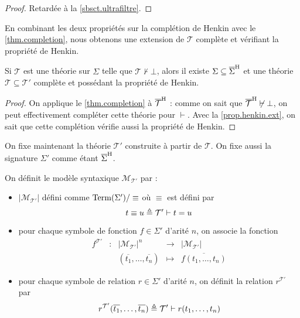 \begin{proof}
  Retardée à la \cref{sbsct.ultrafiltre}.
\end{proof}

En combinant les deux propriétés sur la complétion de Henkin avec le
\cref{thm.completion}, nous obtenons une extension de $\mathcal T$ complète et
vérifiant la propriété de Henkin.

\begin{lemma}
  Si $\mathcal T$ est une théorie sur $\Sigma$ telle que
  $\mathcal T\not\vdash\bot$, alors il existe $\Sigma\subseteq\overline{\Sigma}^{\mathrm H}$
  et une théorie $\mathcal T\subseteq\mathcal T'$ complète et possédant la
  propriété de Henkin.
\end{lemma}

\begin{proof}
  On applique le \cref{thm.completion} à $\overline{\mathcal T}^{\mathrm H}$ : comme on sait
  que $\overline{\mathcal T}^{\mathrm H}\not\vdash\bot$, on peut effectivement compléter cette
  théorie pour $\vdash$. Avec la \cref{prop.henkin.ext}, on sait que cette
  complétion vérifie aussi la propriété de Henkin.
\end{proof}

On fixe maintenant la théorie $\mathcal T'$ construite à partir de $\mathcal T$.
On fixe aussi la signature $\Sigma'$ comme étant $\overline{\Sigma}^{\mathrm H}$.

\begin{definition}
  On définit le modèle syntaxique $\mathcal M_{\mathcal T'}$ par :
  \begin{itemize}
  \item $|\mathcal M_{\mathcal T'}|$ défini comme $\operatorname{Term}(\Sigma')/\equiv$ où
    $\equiv$ est défini par
    \[t\equiv u \triangleq \mathcal T'\vdash t = u\]
  \item pour chaque symbole de fonction $f\in\Sigma'$ d'arité $n$, on associe la
    fonction
    \[\begin{array}{ccccc}
    f^{\mathcal T'} & : & |\mathcal M_{\mathcal T'}|^n & \longrightarrow &
    |\mathcal M_{\mathcal T'}|\\
    & & (\overline{t_1},\ldots,\overline{t_n}) & \longmapsto &
    \overline{f(t_1,\ldots,t_n)}
    \end{array}\]
  \item pour chaque symbole de relation $r\in\Sigma'$ d'arité $n$, on définit la
    relation $r^{\mathcal T'}$ par
    \[r^{\mathcal T'}(\overline{t_1},\ldots,\overline{t_n}) \triangleq
    \mathcal T'\vdash r(t_1,\ldots,t_n)\]
  \end{itemize}
\end{definition}

